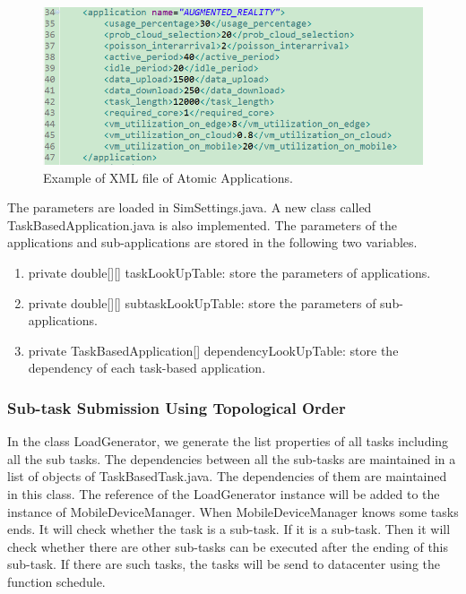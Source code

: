 \begin{figure}
	\centering
	\includegraphics[width=1\textwidth]{./figures/atomic-application-xml.png}
	\caption{\label{fig:frog}Example of XML file of Atomic Applications.}
\end{figure}

The parameters are loaded in SimSettings.java. A new class called TaskBasedApplication.java is also implemented. The parameters of the applications and sub-applications are stored in the following two variables.

\begin{enumerate}
	\item private double[][] taskLookUpTable: store the parameters of applications.
	\item private double[][] subtaskLookUpTable: store the parameters of sub-applications.
	\item private TaskBasedApplication[] dependencyLookUpTable: store the dependency of each task-based application.
\end{enumerate}



\subsubsection{Sub-task Submission Using Topological Order}
In the class LoadGenerator, we generate the list properties of all tasks including all the sub tasks. The dependencies between all the sub-tasks are maintained in a list of objects of TaskBasedTask.java. The dependencies of them are maintained in this class. The reference of the LoadGenerator instance will be added to the instance of MobileDeviceManager. When MobileDeviceManager knows some tasks ends. It will check whether the task is a sub-task. If it is a sub-task. Then it will check whether there are other sub-tasks can be executed after the ending of this sub-task. If there are such tasks, the tasks will be send to datacenter using the function schedule.

